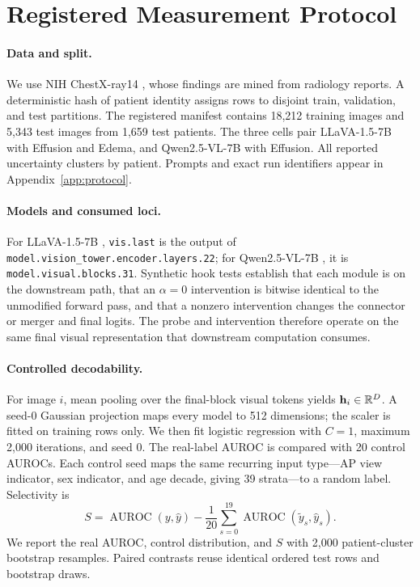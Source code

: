 \section{Registered Measurement Protocol}
\label{sec:protocol}

\paragraph{Data and split.}
We use NIH ChestX-ray14 \citep{wang2017chestxray}, whose findings are mined from radiology reports. A deterministic hash of patient identity assigns rows to disjoint train, validation, and test partitions. The registered manifest contains 18,212 training images and 5,343 test images from 1,659 test patients. The three cells pair LLaVA-1.5-7B with Effusion and Edema, and Qwen2.5-VL-7B with Effusion. All reported uncertainty clusters by patient. Prompts and exact run identifiers appear in Appendix~\ref{app:protocol}.

\paragraph{Models and consumed loci.}
For LLaVA-1.5-7B \citep{liu2024improved}, \texttt{vis.last} is the output of \texttt{model.vision\_tower.encoder.layers.22}; for Qwen2.5-VL-7B \citep{bai2025qwen25vl}, it is \texttt{model.visual.blocks.31}. Synthetic hook tests establish that each module is on the downstream path, that an $\alpha=0$ intervention is bitwise identical to the unmodified forward pass, and that a nonzero intervention changes the connector or merger and final logits. The probe and intervention therefore operate on the same final visual representation that downstream computation consumes.

\paragraph{Controlled decodability.}
For image $i$, mean pooling over the final-block visual tokens yields $\mathbf{h}_i\in\mathbb{R}^D$. A seed-0 Gaussian projection maps every model to 512 dimensions; the scaler is fitted on training rows only. We then fit logistic regression with $C=1$, maximum 2,000 iterations, and seed 0. The real-label AUROC is compared with 20 control AUROCs. Each control seed maps the same recurring input type---AP view indicator, sex indicator, and age decade, giving 39 strata---to a random label. Selectivity is
\begin{equation}
S = \operatorname{AUROC}(y,\hat y)-\frac{1}{20}\sum_{s=0}^{19}\operatorname{AUROC}(\tilde y_s,\hat y_s).
\label{eq:selectivity}
\end{equation}
We report the real AUROC, control distribution, and $S$ with 2,000 patient-cluster bootstrap resamples. Paired contrasts reuse identical ordered test rows and bootstrap draws.


